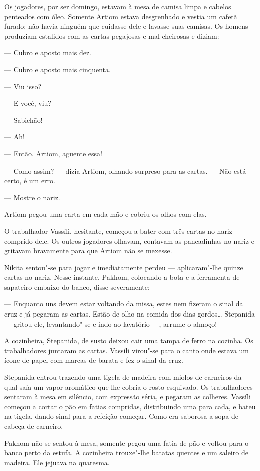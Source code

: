 Os jogadores, por ser domingo, estavam à mesa de camisa limpa e cabelos
penteados com óleo. Somente Artiom estava desgrenhado e vestia um cafetã
furado: não havia ninguém que cuidasse dele e lavasse suas camisas. Os
homens produziam estalidos com as cartas pegajosas e mal cheirosas e
diziam:

--- Cubro e aposto mais dez.

--- Cubro e aposto mais cinquenta.

--- Viu isso?

--- E você, viu?

--- Sabichão!

--- Ah!

--- Então, Artiom, aguente essa!

--- Como assim? --- dizia Artiom, olhando surpreso para as cartas. ---
Não está certo, é um erro.

--- Mostre o nariz.

Artiom pegou uma carta em cada mão e cobriu os olhos com elas.

O trabalhador Vassíli, hesitante, começou a bater com três cartas no
nariz comprido dele. Os outros jogadores olhavam, contavam as
pancadinhas no nariz e gritavam bravamente para que Artiom não se
mexesse.

Nikita sentou"-se para jogar e imediatamente perdeu --- aplicaram"-lhe
quinze cartas no nariz. Nesse instante, Pakhom, colocando a bota e a
ferramenta de sapateiro embaixo do banco, disse severamente:

--- Enquanto uns devem estar voltando da missa, estes nem fizeram o sinal
da cruz e já pegaram as cartas. Estão de olho na comida dos dias
gordos\ldots{} Stepanida --- gritou ele, levantando"-se e indo ao lavatório ---,
arrume o almoço!

A cozinheira, Stepanida, de susto deixou cair uma tampa de ferro na
cozinha. Os trabalhadores juntaram as cartas. Vassíli virou"-se para o
canto onde estava um ícone de papel com marcas de barata e fez o sinal
da cruz.

Stepanida entrou trazendo uma tigela de madeira com miolos de carneiros
da qual saía um vapor aromático que lhe cobria o rosto esquivado.
Os trabalhadores sentaram à mesa em silêncio, com expressão
séria, e pegaram as colheres. Vassíli começou a cortar o pão em fatias
compridas, distribuindo uma para cada, e bateu na tigela, dando sinal
para a refeição começar. Como era saborosa a sopa de cabeça de carneiro.

Pakhom não se sentou à mesa, somente pegou uma fatia de pão e voltou
para o banco perto da estufa. A cozinheira trouxe"-lhe batatas quentes e
um saleiro de madeira. Ele jejuava na quaresma.

